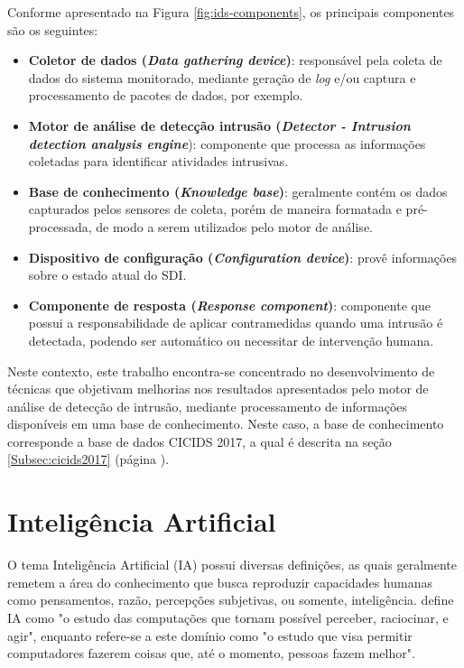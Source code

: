 Conforme apresentado na Figura \ref{fig:ids-components}, os principais componentes são os seguintes:

\begin{itemize}
    \item \textbf{Coletor de dados (\textit{Data gathering device})}: responsável pela coleta de dados do sistema monitorado, mediante geração de \textit{log} e/ou captura e processamento de pacotes de dados, por exemplo.
    \item \textbf{Motor de análise de detecção intrusão (\textit{Detector - Intrusion detection analysis engine}}): componente que processa as informações coletadas para identificar atividades intrusivas.
    \item \textbf{Base de conhecimento (\textit{Knowledge base})}: geralmente contém os dados capturados pelos sensores de coleta, porém de maneira formatada e pré-processada, de modo a serem utilizados pelo motor de análise.
    \item \textbf{Dispositivo de configuração (\textit{Configuration device})}: provê informações sobre o estado atual do SDI.
    \item \textbf{Componente de resposta (\textit{Response component})}: componente que possui a responsabilidade de aplicar contramedidas quando uma intrusão é detectada, podendo ser automático ou necessitar de intervenção humana.
\end{itemize}

Neste contexto, este trabalho encontra-se concentrado no desenvolvimento de técnicas que objetivam melhorias nos resultados apresentados pelo motor de análise de detecção de intrusão, mediante processamento de informações disponíveis em uma base de conhecimento. Neste caso, a base de conhecimento corresponde a base de dados CICIDS 2017, a qual é descrita na seção \ref{Subsec:cicids2017} (página \pageref{Subsec:cicids2017}). 

\section{Inteligência Artificial}

O tema Inteligência Artificial (IA) possui diversas definições, as quais  geralmente remetem a área do conhecimento que busca reproduzir capacidades humanas como pensamentos, razão, percepções subjetivas, ou somente, inteligência.  define IA como "o estudo das computações que tornam possível perceber, raciocinar, e agir", enquanto  refere-se a este domínio como "o estudo que visa permitir computadores fazerem coisas que, até o momento, pessoas fazem melhor".


